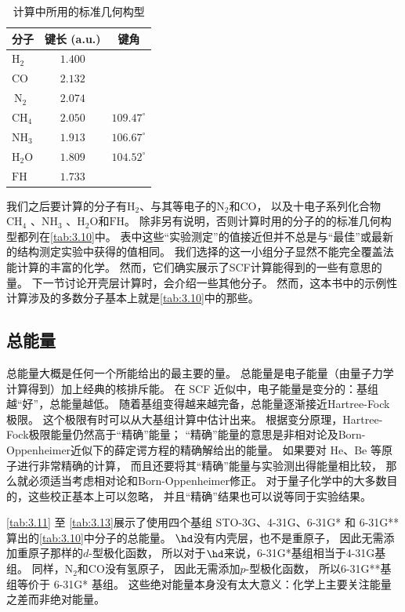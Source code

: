 \begin{table}\centering
	\caption{计算中所用的标准几何构型}
	\begin{tabular}{lcc}
		\hline 分子 & 键长 (a.u.) & 键角 \\
		\hline $\mathrm{H}_2$ & $1.400$ & \\
		$\mathrm{CO}$ & $2.132$ & \\
		$\mathrm{~N}_2$ & $2.074$ & \\
		$\mathrm{CH}_4$ & $2.050$ & $109.47^{\circ}$ \\
		$\mathrm{NH}_3$ & $1.913$ & $106.67^{\circ}$ \\
		$\mathrm{H}_2 \mathrm{O}$ & $1.809$ & $104.52^{\circ}$ \\
		$\mathrm{FH}$ & $1.733$ & \\
		\hline
	\end{tabular}
\label{tab:3.10}
\end{table}

我们之后要计算的分子有$\mathrm{H}_2$、与其等电子的$\mathrm{N}_2$和$\mathrm{CO}$，
以及十电子系列化合物$\mathrm{CH}_4$ 、$\mathrm{NH_3}$ 、$\mathrm{H_2O}$和$\mathrm{FH}$。 
除非另有说明，否则计算时用的分子的的标准几何构型都列在\autoref{tab:3.10}中。 
表中这些“实验测定”的值接近但并不总是与“最佳”或最新的结构测定实验中获得的值相同。 
我们选择的这一小组分子显然不能完全覆盖法能计算的丰富的化学。 
然而，它们确实展示了SCF计算能得到的一些有意思的量。 
下一节讨论开壳层计算时，会介绍一些其他分子。
然而，这本书中的示例性计算涉及的多数分子基本上就是\autoref{tab:3.10}中的那些。

\subsection{总能量}
总能量大概是任何一个所能给出的最主要的量。 
总能量是电子能量（由量子力学计算得到）加上经典的核排斥能。
在 SCF 近似中，电子能量是变分的：基组越“好”，总能量越低。
随着基组变得越来越完备，总能量逐渐接近Hartree-Fock 极限。 
这个极限有时可以从大基组计算中估计出来。
根据变分原理，Hartree-Fock极限能量仍然高于“精确”能量；
“精确”能量的意思是非相对论及Born-Oppenheimer近似下的薛定谔方程的精确解给出的能量。 
如果要对 He、Be 等原子进行非常精确的计算，
而且还要将其“精确”能量与实验测出得能量相比较，
那么就必须适当考虑相对论和Born-Oppenheimer修正。
对于量子化学中的大多数目的，这些校正基本上可以忽略，
并且“精确”结果也可以说等同于实验结果。


\autoref{tab:3.11} 至 \autoref{tab:3.13}展示了使用四个基组
STO-3G、4-31G、6-31G* 和 6-31G** 算出的\autoref{tab:3.10}中分子的总能量。
 $\hd$没有内壳层，也不是重原子，
因此无需添加重原子那样的$d$-型极化函数，
所以对于$\hd$来说，6-31G*基组相当于4-31G基组。
同样，$\mathrm{N_2}$和$\mathrm{CO}$没有氢原子，
因此无需添加$p$-型极化函数，
所以6-31G**基组等价于 6-31G* 基组。
这些绝对能量本身没有太大意义：化学上主要关注能量之差而非绝对能量。

